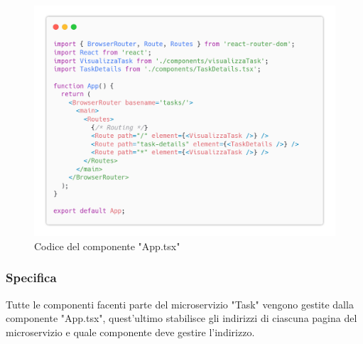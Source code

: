 \documentclass{report}
\begin{document}
\begin{figure}[H]
	\centering\includegraphics[width=1\textwidth]{images/microservizio-task/frontend/app-carbon.png}
	Codice del componente "App.tsx"
\end{figure}
\subsubsection*{Specifica}
Tutte le componenti facenti parte del microservizio "Task" vengono gestite dalla componente "App.tsx", quest'ultimo stabilisce gli indirizzi di ciascuna pagina del microservizio e quale componente deve gestire l'indirizzo. 
\end{document}
